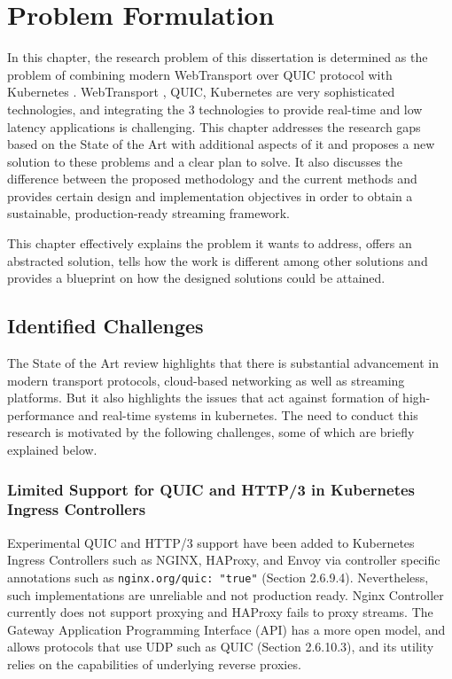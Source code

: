 \chapter{Problem Formulation}

In this chapter, the research problem of this dissertation is determined as the problem of combining modern WebTransport over QUIC protocol \cite{rfc9000} with Kubernetes \cite{kubernetes-docs}. WebTransport \cite{webtransport-draft}, QUIC, Kubernetes are very sophisticated technologies, and integrating the 3 technologies to provide real-time and low latency applications is challenging. This chapter addresses the research gaps based on the State of the Art with additional aspects of it and proposes a new solution to these problems and a clear plan to solve. It also discusses the difference between the proposed methodology and the current methods and provides certain design and implementation objectives in order to obtain a sustainable, production-ready streaming framework.

This chapter effectively explains the problem it wants to address, offers an abstracted solution, tells how the work is different among other solutions and provides a blueprint on how the designed solutions could be attained.

\section{Identified Challenges}
The State of the Art review highlights that there is substantial advancement in modern transport protocols, cloud-based networking as well as streaming platforms. But it also highlights the issues that act against formation of high-performance and real-time systems in kubernetes. The need to conduct this research is motivated by the following challenges, some of which are briefly explained below.

\subsection{Limited Support for QUIC and HTTP/3 in Kubernetes Ingress Controllers}
Experimental QUIC and HTTP/3 support have been added to Kubernetes Ingress Controllers such as NGINX, HAProxy, and Envoy via controller specific annotations such as \texttt{nginx.org/quic: "true"} (Section 2.6.9.4). Nevertheless, such implementations are unreliable and not production ready. Nginx Controller currently does not support proxying and HAProxy fails to proxy streams. The Gateway Application Programming Interface (API) has a more open model, and allows protocols that use UDP such as QUIC (Section 2.6.10.3), and its utility relies on the capabilities of underlying reverse proxies.

